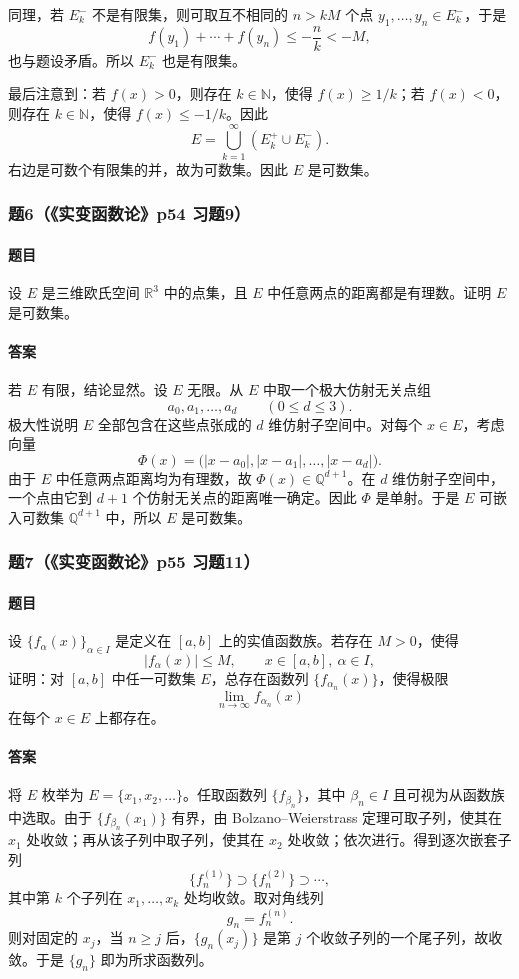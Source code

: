 \documentclass{article}
\newcommand{\R}{\mathbb{R}}
\newcommand{\Q}{\mathbb{Q}}
\newcommand{\N}{\mathbb{N}}
\begin{document}
同理，若 $E_k^-$ 不是有限集，则可取互不相同的 $n>kM$ 个点 $y_1,\ldots,y_n\in E_k^-$，于是
\[
f(y_1)+\cdots+f(y_n)\le -\frac{n}{k}<-M,
\]
也与题设矛盾。所以 $E_k^-$ 也是有限集。

最后注意到：若 $f(x)>0$，则存在 $k\in\N$，使得 $f(x)\ge 1/k$；若 $f(x)<0$，则存在 $k\in\N$，使得 $f(x)\le -1/k$。因此
\[
E=\bigcup_{k=1}^{\infty}\left(E_k^+\cup E_k^-\right).
\]
右边是可数个有限集的并，故为可数集。因此 $E$ 是可数集。

\subsubsection*{题6（《实变函数论》p54 习题9）}
\paragraph{题目}设 $E$ 是三维欧氏空间 $\R^3$ 中的点集，且 $E$ 中任意两点的距离都是有理数。证明 $E$ 是可数集。

\paragraph{答案}若 $E$ 有限，结论显然。设 $E$ 无限。从 $E$ 中取一个极大仿射无关点组
\[
a_0,a_1,\ldots,a_d\qquad (0\le d\le 3).
\]
极大性说明 $E$ 全部包含在这些点张成的 $d$ 维仿射子空间中。对每个 $x\in E$，考虑向量
\[
\Phi(x)=\bigl(|x-a_0|,|x-a_1|,\ldots,|x-a_d|\bigr).
\]
由于 $E$ 中任意两点距离均为有理数，故 $\Phi(x)\in\Q^{d+1}$。在 $d$ 维仿射子空间中，一个点由它到 $d+1$ 个仿射无关点的距离唯一确定。因此 $\Phi$ 是单射。于是 $E$ 可嵌入可数集 $\Q^{d+1}$ 中，所以 $E$ 是可数集。

\subsubsection*{题7（《实变函数论》p55 习题11）}
\paragraph{题目}设 $\{f_\alpha(x)\}_{\alpha\in I}$ 是定义在 $[a,b]$ 上的实值函数族。若存在 $M>0$，使得
\[
|f_\alpha(x)|\le M,\qquad x\in[a,b],\ \alpha\in I,
\]
证明：对 $[a,b]$ 中任一可数集 $E$，总存在函数列 $\{f_{\alpha_n}(x)\}$，使得极限
\[
\lim_{n\to\infty}f_{\alpha_n}(x)
\]
在每个 $x\in E$ 上都存在。

\paragraph{答案}将 $E$ 枚举为 $E=\{x_1,x_2,\ldots\}$。任取函数列 $\{f_{\beta_n}\}$，其中 $\beta_n\in I$ 且可视为从函数族中选取。由于 $\{f_{\beta_n}(x_1)\}$ 有界，由 Bolzano--Weierstrass 定理可取子列，使其在 $x_1$ 处收敛；再从该子列中取子列，使其在 $x_2$ 处收敛；依次进行。得到逐次嵌套子列
\[
\{f^{(1)}_n\}\supset\{f^{(2)}_n\}\supset\cdots,
\]
其中第 $k$ 个子列在 $x_1,
\ldots,x_k$ 处均收敛。取对角线列
\[
g_n=f^{(n)}_n.
\]
则对固定的 $x_j$，当 $n\ge j$ 后，$\{g_n(x_j)\}$ 是第 $j$ 个收敛子列的一个尾子列，故收敛。于是 $\{g_n\}$ 即为所求函数列。
\end{document}
